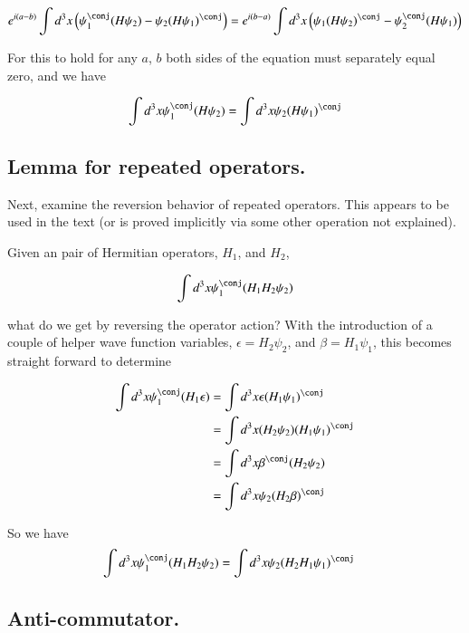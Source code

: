 \begin{align*}
e^{i(a-b)} \int d^3 x \left( \psi_1^\conj (H \psi_2) - \psi_2 (H \psi_1)^\conj \right) = e^{i(b-a)} \int d^3 x \left( \psi_1 (H \psi_2)^\conj - \psi_2^\conj (H \psi_1) \right)
\end{align*}

For this to hold for any $a$, $b$ both sides of the equation must separately equal zero, and we have

\begin{align}\label{eqn:HermitianTwo}
\int d^3 x \psi_1^\conj (H \psi_2) = \int d^3 x \psi_2 (H \psi_1)^\conj
\end{align}

\subsection{Lemma for repeated operators. }

Next, examine the reversion behavior of repeated operators.  This appears to be used in the text (or is proved implicitly via some other operation not explained).

Given an pair of Hermitian operators, $H_1$, and $H_2$, 

\begin{align*}
\int d^3 x \psi_1^\conj (H_1 H_2 \psi_2)
\end{align*}

what do we get by reversing the operator action?  With the introduction of a couple of helper wave function variables, $\epsilon = H_2 \psi_2$, and $\beta = H_1 \psi_1$, 
this becomes straight forward to determine

\begin{align*}
\int d^3 x \psi_1^\conj (H_1 \epsilon)
&=
\int d^3 x \epsilon (H_1 \psi_1)^\conj \\
&=
\int d^3 x (H_2 \psi_2) (H_1 \psi_1)^\conj \\
&=
\int d^3 x \beta^\conj (H_2 \psi_2) \\
&=
\int d^3 x \psi_2 (H_2 \beta)^\conj \\
\end{align*}

So we have
\begin{align}\label{eqn:reverse}
\int d^3 x \psi_1^\conj (H_1 H_2 \psi_2) &= \int d^3 x \psi_2 (H_2 H_1 \psi_1)^\conj 
\end{align}

\subsection{Anti-commutator. }

